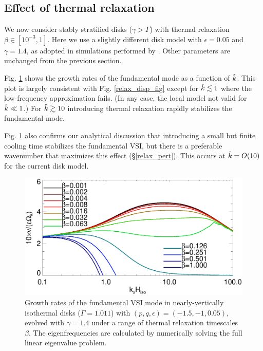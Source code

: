 \subsection{Effect of thermal relaxation}
We now consider stably stratified disks ($\gamma > \Gamma$) with
thermal relaxation $\beta\in[10^{-3},1]$. Here we use a slightly 
different disk model with $\epsilon=0.05$ and $\gamma=1.4$, as
adopted in simulations performed by \cite{nelson13}. Other parameters
are unchanged from the previous section.  

Fig. \ref{relax_growth_num} shows the growth rates of the fundamental  
mode as a function of $\hat{k}$. This plot is largely consistent with  
Fig. \ref{relax_disp_fig} except for $\hat{k}\lesssim 1$
where the low-frequency approximation fails. (In any case, the local model not valid
for $\hat{k}\ll1$.) For $\hat{k}\gtrsim 10$ introducing thermal
relaxation rapidly stabilizes the fundamental mode. 


Fig. \ref{relax_growth_num} also confirms our analytical discussion that
introducing a small but finite cooling time stabilizes the fundamental
VSI, but there is a preferable wavenumber that maximizes this effect (\S\ref{relax_pert}).
This occurs at $\hat{k}= O(10)$ for the current disk model. 

\begin{figure}
   \includegraphics[width=\linewidth,clip=true,trim=0cm 0.0cm 0cm
   0cm]{figures/compare_eigen_imag_bloop} 
  \caption{Growth rates of the fundamental VSI mode in 
    nearly-vertically isothermal disks ($\Gamma=1.011$) with
    $(p,q,\epsilon)=(-1.5,-1,0.05)$, evolved with $\gamma=1.4$ under a
    range of thermal relaxation timescales   
    $\beta$. The eigenfrequencies are calculated by numerically 
    solving the full linear eigenvalue problem. \label{relax_growth_num}}   
\end{figure}   


